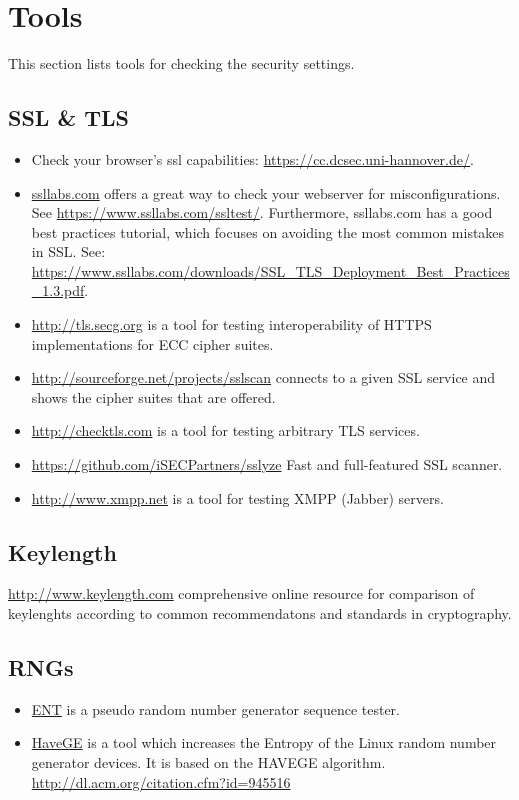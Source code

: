 \section{Tools}
\label{section:Tools}
This section lists tools for checking the security settings.

\subsection{SSL \& TLS}

\begin{itemize}
\item Check your browser's ssl capabilities: \url{https://cc.dcsec.uni-hannover.de/}.
\item \href{http://ssllabs.com}{ssllabs.com} offers a great way to check your webserver for misconfigurations. See \url{https://www.ssllabs.com/ssltest/}.
Furthermore, ssllabs.com has a good best practices tutorial, which focuses on avoiding the most common mistakes in SSL.
See: \url{https://www.ssllabs.com/downloads/SSL_TLS_Deployment_Best_Practices_1.3.pdf}.
\item \url{http://tls.secg.org} is a tool for testing interoperability of HTTPS implementations for ECC cipher suites.
\item \url{http://sourceforge.net/projects/sslscan} connects to a given SSL service and shows the cipher suites that are offered.
\item \url{http://checktls.com} is a tool for testing arbitrary TLS services. 
\item \url{https://github.com/iSECPartners/sslyze} Fast and full-featured SSL scanner.
\item \url{http://www.xmpp.net} is a tool for testing XMPP (Jabber) servers.
\end{itemize}

\subsection{Keylength}

\url{http://www.keylength.com} comprehensive online resource for comparison of keylenghts according to common recommendatons and standards in cryptography.

\subsection{RNGs}

\begin{itemize}
\item \href{http://www.fourmilab.ch/random/}{ENT} is a pseudo random number generator sequence tester.  
\item \href{http://www.issihosts.com/haveged/}{HaveGE} is a tool which increases the Entropy of the Linux random number generator devices. It is based on the HAVEGE algorithm. \url{http://dl.acm.org/citation.cfm?id=945516}
\end{itemize}



